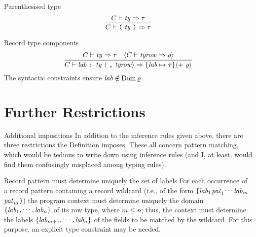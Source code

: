 \begin{sml-rule}{Parenthesised type}
\begin{equation}\label{rule:static-core:parenthesised-type}
  \vcenter{\infer{\C\ts\partype\ra\tau}
    {\C\ts\ty\ra\tau}}
\end{equation}
\end{sml-rule}


\begin{sml-rule}{Record type components}
\begin{equation}\label{rule:static-core:record-type-components}
  \vcenter{\infer{\C\ts\longlabtys\ra\{\lab\mapsto\tau\}\optional{ +\ \varrho}}
    {\C\ts\ty\ra\tau
      & \optional{\C\ts\labtys\ra\varrho}}}
\end{equation}
The syntactic constraints ensure $\textit{lab\/}\notin\mathop{\rm Dom}\nolimits\varrho$.
\end{sml-rule}


\section{Further Restrictions}

\begin{remark}{Additional impositions}
In addition to the inference rules given above, there are three
restrictions the Definition imposes. These all concern pattern matching,
which would be tedious to write down using inference rules (and I, at
least, would find them confusingly misplaced among typing rules).
\end{remark}

\begin{clause}{Record pattern must determine uniquely the set of labels}
For each occurrence of a record pattern containing a record wildcard
(i.e., of the form
\verb+{+${\it lab}_{1}$\ml{=}$\textit{pat\/}_{1}$\ml{,}$\mathinner{{}^{\textstyle .\,.\,.}}$\ml{,}${\it lab}_{m}$\ml{=}$\textit{pat\/}_{m}$\ml{,}\wildcardrow\verb+}+)
the program context must determine uniquely the domain
$\{{\it lab}_{1},\mathinner{{}^{\textstyle .\,.\,.}},{\it lab}_{n}\}$
of its row type, where $m\leq n$; thus, the context must
determine the labels $\{{\it lab}_{m+1},\mathinner{{}^{\textstyle .\,.\,.}},{\it lab}_{n}\}$ of the fields
to be matched by the wildcard. For this purpose, an explicit type
constraint may be needed.
\end{clause}

